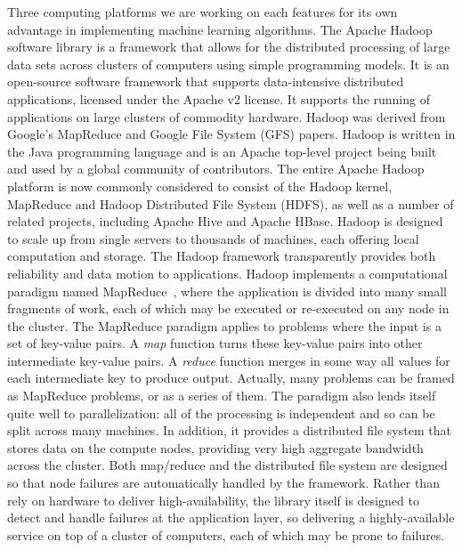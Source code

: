 \documentclass{llncs}
\begin{document}
Three computing platforms we are working on each features for its own advantage in implementing machine learning algorithms.
The Apache Hadoop~\cite{white2012hadoop} software library is a framework that allows for the distributed processing of large data sets across clusters of computers using simple programming models. It is an open-source software framework that supports data-intensive distributed applications, licensed under the Apache v2 license. It supports the running of applications on large clusters of commodity hardware. Hadoop was derived from Google's MapReduce and Google File System (GFS) papers. Hadoop is written in the Java programming language and is an Apache top-level project being built and used by a global community of contributors. The entire Apache Hadoop platform is now commonly considered to consist of the Hadoop kernel, MapReduce and Hadoop Distributed File System (HDFS), as well as a number of related projects, including Apache Hive and Apache HBase.
Hadoop is designed to scale up from single servers to thousands of machines, each offering local computation and storage.
The Hadoop framework transparently provides both reliability and data motion to applications.
Hadoop implements a computational paradigm named MapReduce~\cite{dean2008mapreduce}, where the application is divided into many small fragments of work, each of which may be executed or re-executed on any node in the cluster.
The MapReduce paradigm applies to problems where the input is a set of key-value pairs.
A \textit{map} function turns these key-value pairs into other intermediate key-value pairs. A \textit{reduce} function merges in some way all values for each intermediate key to produce output.
Actually, many problems can be framed as MapReduce problems, or as a series of them. The paradigm also lends itself quite well to parallelization: all of the processing is independent and so can be split across many machines.
In addition, it provides a distributed file system that stores data on the compute nodes, providing very high aggregate bandwidth across the cluster.
Both map/reduce and the distributed file system are designed so that node failures are automatically handled by the framework.
Rather than rely on hardware to deliver high-availability, the library itself is designed to detect and handle failures at the application layer, so delivering a highly-available service on top of a cluster of computers, each of which may be prone to failures.
\end{document}
